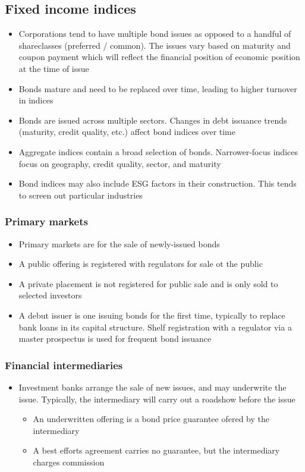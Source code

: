 \documentclass[../notes_compiled.tex]{subfiles}
\begin{document}
\subsection{Fixed income indices}
\begin{itemize}
\item Corporations tend to have multiple bond issues as opposed to a handful of shareclasses (preferred / common). The issues vary based on maturity and coupon payment which will reflect the financial position of economic position at the time of issue
\item Bonds mature and need to be replaced over time, leading to higher turnover in indices
\item Bonds are issued across multiple sectors. Changes in debt issuance trends (maturity, credit quality, etc.) affect bond indices over time
\item Aggregate indices contain a broad selection of bonds. Narrower-focus indices focus on geography, credit quality, sector, and maturity
\item Bond indices may also include ESG factors in their construction. This tends to screen out particular industries
\end{itemize}

\subsubsection*{Primary markets}
\begin{itemize}
\item[] Primary markets are for the sale of newly-issued bonds
\item A public offering is registered with regulators for sale ot the public
\item A private placement is not registered for public sale and is only sold to selected investors
\item A debut issuer is one issuing bonds for the first time, typically to replace bank loans in its capital structure. Shelf registration with a regulator via a master prospectus is used for frequent bond issuance
\end{itemize}

\subsubsection*{Financial intermediaries}
\begin{itemize}
\item Investment banks arrange the sale of new issues, and may underwrite the issue. Typically, the intermediary will carry out a roadshow before the issue
\begin{itemize}
\item An underwritten offering is a bond price guarantee ofered by the intermediary
\item A best efforts agreement carries no guarantee, but the intermediary charges commission
\end{itemize}
\end{itemize}
\end{document}
